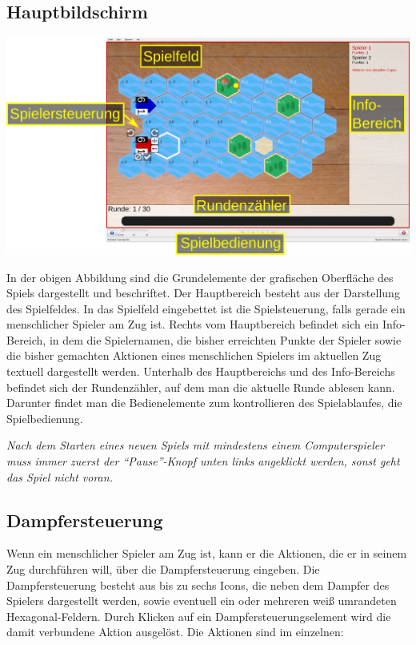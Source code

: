 \documentclass[12pt,a4paper, ngerman, oneside]{scrartcl}
\begin{document}
\subsection{Hauptbildschirm}

\begin{centering}
  \includegraphics[width=\textwidth]{bilder/gui-elemente.pdf}
\end{centering}

In der obigen Abbildung sind die Grundelemente der grafischen Oberfläche des
Spiels dargestellt und beschriftet. Der Hauptbereich besteht aus der Darstellung
des Spielfeldes. In das Spielfeld eingebettet ist die Spielsteuerung, falls
gerade ein menschlicher Spieler am Zug ist. Rechts vom Hauptbereich befindet
sich ein Info-Bereich, in dem die Spielernamen, die bisher erreichten Punkte der
Spieler sowie die bisher gemachten Aktionen eines menschlichen Spielers im
aktuellen Zug textuell dargestellt werden. Unterhalb des Hauptbereichs und des
Info-Bereichs befindet sich der Rundenzähler, auf dem man die aktuelle Runde
ablesen kann. Darunter findet man die Bedienelemente zum kontrollieren des
Spielablaufes, die Spielbedienung.

\emph{Nach dem Starten eines neuen Spiels mit mindestens einem Computerspieler
  muss immer zuerst der ``Pause''-Knopf unten links angeklickt werden, sonst
  geht das Spiel nicht voran.}

\subsection{Dampfersteuerung}

Wenn ein menschlicher Spieler am Zug ist, kann er die Aktionen, die er in seinem
Zug durchführen will, über die Dampfersteuerung eingeben. Die Dampfersteuerung
besteht aus bis zu sechs Icons, die neben dem Dampfer des Spielers dargestellt
werden, sowie eventuell ein oder mehreren weiß umrandeten Hexagonal-Feldern.
Durch Klicken auf ein Dampfersteuerungselement wird die damit verbundene Aktion
ausgelöst. Die Aktionen sind im einzelnen:
\end{document}

